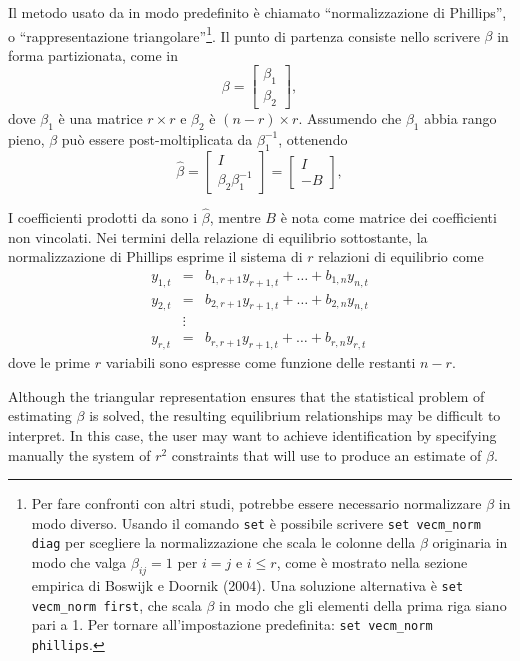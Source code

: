 Il metodo usato da  in modo predefinito è chiamato ``normalizzazione
di Phillips'', o ``rappresentazione triangolare''\footnote{Per fare confronti
  con altri studi, potrebbe essere necessario normalizzare $\beta$ in modo
  diverso. Usando il comando \texttt{set} è possibile scrivere
  \verb|set vecm_norm diag| per scegliere la normalizzazione che scala
  le colonne della $\beta$ originaria in modo che valga $\beta_{ij} = 1$ per $i=j$
  e $i \leq r$, come è mostrato nella sezione empirica di Boswijk e
  Doornik (2004).  Una soluzione alternativa è \verb+set vecm_norm first+,
  che scala $\beta$ in modo che gli elementi della prima riga siano pari a 1.
  Per tornare all'impostazione predefinita: \texttt{set vecm\_norm phillips}.
}. Il punto di partenza consiste nello scrivere $\beta$ in forma partizionata, come in
\[
  \beta = \left[
    \begin{array}{c} \beta_1 \\ \beta_2  \end{array}
    \right] ,
\]
dove $\beta_1$ è una matrice $r \times r$ e  $\beta_2$ è $(n-r)
\times r$. Assumendo che $\beta_1$ abbia rango pieno, $\beta$ può essere
post-moltiplicata da $\beta_1^{-1}$, ottenendo
\[
  \hat{\beta} = \left[
    \begin{array}{c} I \\ \beta_2 \beta_1^{-1}  \end{array}
    \right] =
    \left[
    \begin{array}{c} I \\ -B \end{array}
  \right]  ,
\]

I coefficienti prodotti da  sono i $\hat{\beta}$, mentre
$B$ è nota come matrice dei coefficienti non vincolati. Nei termini della
relazione di equilibrio sottostante, la normalizzazione di Phillips
esprime il sistema di $r$ relazioni di equilibrio come
  \begin{eqnarray}
    y_{1,t} & = & b_{1,r+1} y_{r+1,t} + \ldots + b_{1,n} y_{n,t} \\
    y_{2,t} & = & b_{2,r+1} y_{r+1,t} + \ldots + b_{2,n} y_{n,t} \\
    & \vdots & \\
    y_{r,t} & = & b_{r,r+1} y_{r+1,t} + \ldots + b_{r,n} y_{r,t} 
  \end{eqnarray}
dove le prime $r$ variabili sono espresse come funzione delle restanti
$n-r$.

Although the triangular representation ensures that the statistical
problem of estimating $\beta$ is solved, the resulting equilibrium
relationships may be difficult to interpret. In this case, the user
may want to achieve identification by specifying manually the system
of $r^2$ constraints that  will use to produce an estimate
of $\beta$.


